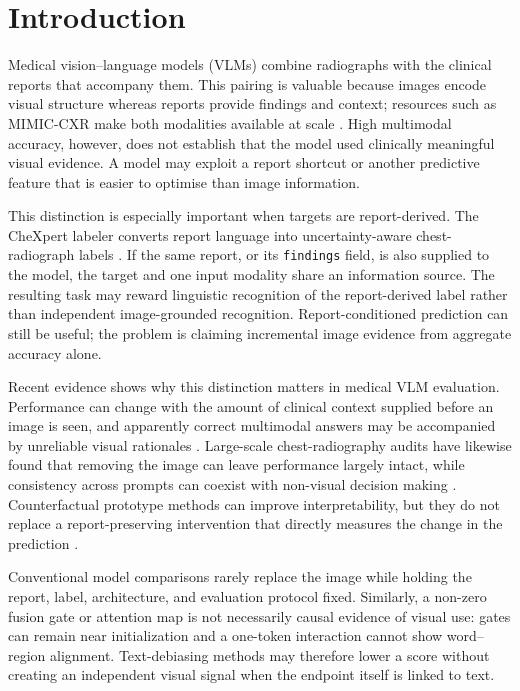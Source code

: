 
\section{Introduction}\label{sec:introduction}

Medical vision--language models (VLMs) combine radiographs with the clinical reports
that accompany them. This pairing is valuable because images encode visual
structure whereas reports provide findings and context; resources such as
MIMIC-CXR make both modalities available at scale \citep{johnson2019mimiccxr}.
High multimodal accuracy, however, does not establish that the model used
clinically meaningful visual evidence. A model may exploit a report shortcut or
another predictive feature that is easier to optimise than image information.

This distinction is especially important when targets are report-derived. The
CheXpert labeler converts report language into uncertainty-aware
chest-radiograph labels \citep{irvin2019chexpert}. If the same report, or its
\texttt{findings} field, is also supplied to the model, the target and one
input modality share an information source. The resulting task may reward
linguistic recognition of the report-derived label rather than independent
image-grounded recognition. Report-conditioned prediction can still be useful;
the problem is claiming incremental image evidence from aggregate accuracy
alone.

Recent evidence shows why this distinction matters in medical VLM evaluation.
Performance can change with the amount of clinical context supplied before an
image is seen, and apparently correct multimodal answers may be accompanied by
unreliable visual rationales \citep{wang2026clinicalcontext,jin2024hiddenflaws}.
Large-scale chest-radiography audits have likewise found that removing the
image can leave performance largely intact, while consistency across prompts
can coexist with non-visual decision making \citep{lotfinia2026needimage,sadanandan2026consistentdangerous}.
Counterfactual prototype methods can improve interpretability, but they do not
replace a report-preserving intervention that directly measures the change in
the prediction \citep{chiang2026cxrnexus}.

Conventional model comparisons rarely replace the image while holding the
report, label, architecture, and evaluation protocol fixed. Similarly, a
non-zero fusion gate or attention map is not necessarily causal evidence of
visual use: gates can remain near initialization and a one-token interaction
cannot show word--region alignment. Text-debiasing methods may therefore lower
a score without creating an independent visual signal when the endpoint itself
is linked to text.

